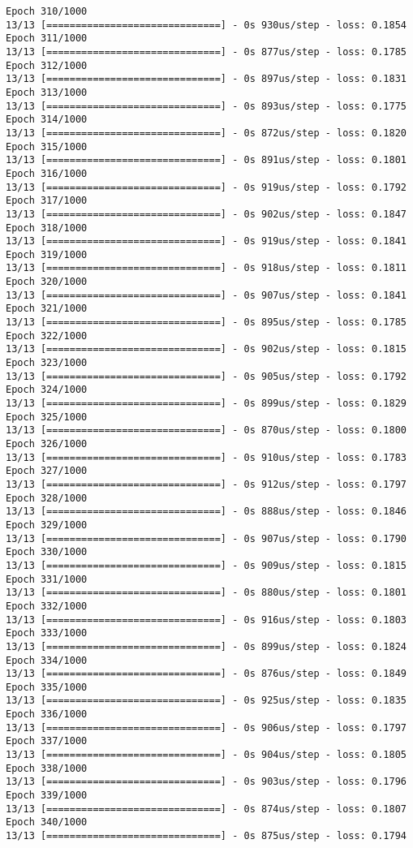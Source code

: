 \documentclass[11pt]{article}
\begin{document}
\begin{Verbatim}[commandchars=\\\{\}]
Epoch 310/1000
13/13 [==============================] - 0s 930us/step - loss: 0.1854
Epoch 311/1000
13/13 [==============================] - 0s 877us/step - loss: 0.1785
Epoch 312/1000
13/13 [==============================] - 0s 897us/step - loss: 0.1831
Epoch 313/1000
13/13 [==============================] - 0s 893us/step - loss: 0.1775
Epoch 314/1000
13/13 [==============================] - 0s 872us/step - loss: 0.1820
Epoch 315/1000
13/13 [==============================] - 0s 891us/step - loss: 0.1801
Epoch 316/1000
13/13 [==============================] - 0s 919us/step - loss: 0.1792
Epoch 317/1000
13/13 [==============================] - 0s 902us/step - loss: 0.1847
Epoch 318/1000
13/13 [==============================] - 0s 919us/step - loss: 0.1841
Epoch 319/1000
13/13 [==============================] - 0s 918us/step - loss: 0.1811
Epoch 320/1000
13/13 [==============================] - 0s 907us/step - loss: 0.1841
Epoch 321/1000
13/13 [==============================] - 0s 895us/step - loss: 0.1785
Epoch 322/1000
13/13 [==============================] - 0s 902us/step - loss: 0.1815
Epoch 323/1000
13/13 [==============================] - 0s 905us/step - loss: 0.1792
Epoch 324/1000
13/13 [==============================] - 0s 899us/step - loss: 0.1829
Epoch 325/1000
13/13 [==============================] - 0s 870us/step - loss: 0.1800
Epoch 326/1000
13/13 [==============================] - 0s 910us/step - loss: 0.1783
Epoch 327/1000
13/13 [==============================] - 0s 912us/step - loss: 0.1797
Epoch 328/1000
13/13 [==============================] - 0s 888us/step - loss: 0.1846
Epoch 329/1000
13/13 [==============================] - 0s 907us/step - loss: 0.1790
Epoch 330/1000
13/13 [==============================] - 0s 909us/step - loss: 0.1815
Epoch 331/1000
13/13 [==============================] - 0s 880us/step - loss: 0.1801
Epoch 332/1000
13/13 [==============================] - 0s 916us/step - loss: 0.1803
Epoch 333/1000
13/13 [==============================] - 0s 899us/step - loss: 0.1824
Epoch 334/1000
13/13 [==============================] - 0s 876us/step - loss: 0.1849
Epoch 335/1000
13/13 [==============================] - 0s 925us/step - loss: 0.1835
Epoch 336/1000
13/13 [==============================] - 0s 906us/step - loss: 0.1797
Epoch 337/1000
13/13 [==============================] - 0s 904us/step - loss: 0.1805
Epoch 338/1000
13/13 [==============================] - 0s 903us/step - loss: 0.1796
Epoch 339/1000
13/13 [==============================] - 0s 874us/step - loss: 0.1807
Epoch 340/1000
13/13 [==============================] - 0s 875us/step - loss: 0.1794

\end{Verbatim}
\end{document}
